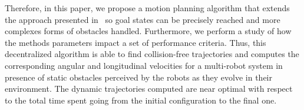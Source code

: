 \documentclass[eprint]{actapoly}
\begin{document}
%
%
%
% 
%
%
% 
%
%
% 
%

 


Therefore, in this paper, we propose a motion planning algorithm that extends 
the approach presented in~\cite{Defoort2009} so goal states can be precisely
reached and more complexes forms of obstacles handled. Furthermore, we perform a study 
of how the methods parameters impact a set of performance criteria.
Thus, this decentralized algorithm is able to find collision-free trajectories and 
computes the corresponding
angular and longitudinal velocities for a multi-robot system in 
presence of static obstacles perceived by the robots as they evolve 
in their environment. The dynamic trajectories computed are near optimal with 
respect to the total time spent going from the initial configuration to the 
final one.

\end{document}
